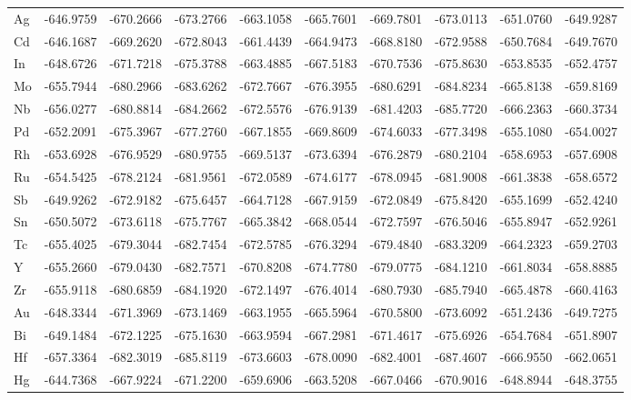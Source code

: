 \documentclass[a4paper, 12pt]{article}
\begin{document}
\begin{table}[htbp]
{\begin{tabular}{l *{9}{l}}
        Ag	& -646.9759	&-670.2666	&-673.2766	&-663.1058	&-665.7601	&-669.7801	&-673.0113	&-651.0760  &-649.9287 \\
        Cd	& -646.1687	&-669.2620  &-672.8043	&-661.4439	&-664.9473	&-668.8180  &-672.9588	&-650.7684	&-649.7670 \\
        In	& -648.6726	&-671.7218	&-675.3788	&-663.4885	&-667.5183	&-670.7536	&-675.8630  &-653.8535	&-652.4757 \\
        Mo	& -655.7944	&-680.2966	&-683.6262	&-672.7667	&-676.3955	&-680.6291	&-684.8234	&-665.8138	&-659.8169 \\
        Nb	& -656.0277	&-680.8814	&-684.2662	&-672.5576	&-676.9139	&-681.4203	&-685.7720  &-666.2363	&-660.3734 \\
        Pd	& -652.2091	&-675.3967	&-677.2760  &-667.1855	&-669.8609	&-674.6033	&-677.3498	&-655.1080  &-654.0027 \\
        Rh	& -653.6928	&-676.9529	&-680.9755	&-669.5137	&-673.6394	&-676.2879	&-680.2104	&-658.6953	&-657.6908 \\
        Ru	& -654.5425	&-678.2124	&-681.9561	&-672.0589	&-674.6177	&-678.0945	&-681.9008	&-661.3838	&-658.6572 \\
        Sb	& -649.9262	&-672.9182	&-675.6457	&-664.7128	&-667.9159	&-672.0849	&-675.8420 	&-655.1699	&-652.4240 \\
        Sn	& -650.5072	&-673.6118	&-675.7767	&-665.3842	&-668.0544	&-672.7597	&-676.5046	&-655.8947	&-652.9261 \\
        Tc	& -655.4025	&-679.3044	&-682.7454	&-672.5785	&-676.3294	&-679.4840  &-683.3209	&-664.2323	&-659.2703 \\
        Y	  & -655.2660 &-679.0430	&-682.7571	&-670.8208	&-674.7780  &-679.0775	&-684.1210  &-661.8034	&-658.8885 \\
        Zr	& -655.9118	&-680.6859	&-684.1920  &-672.1497	&-676.4014	&-680.7930  &-685.7940  &-665.4878	&-660.4163 \\
        Au	& -648.3344	&-671.3969	&-673.1469	&-663.1955	&-665.5964	&-670.5800	&-673.6092	&-651.2436	&-649.7275 \\
        Bi	& -649.1484	&-672.1225	&-675.1630  &-663.9594	&-667.2981	&-671.4617	&-675.6926	&-654.7684	&-651.8907 \\
        Hf	& -657.3364	&-682.3019	&-685.8119	&-673.6603	&-678.0090  &-682.4001	&-687.4607	&-666.9550  &-662.0651 \\
        Hg	& -644.7368	&-667.9224	&-671.2200	&-659.6906	&-663.5208	&-667.0466	&-670.9016	&-648.8944	&-648.3755 \\

\end{tabular}}
\end{table}
\end{document}
